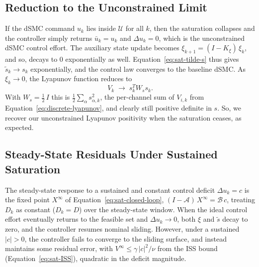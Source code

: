 \documentclass[conf]{new-aiaa}
\begin{document}
\subsection{Reduction to the Unconstrained Limit}
\label{sec:sat-reduction}

If the dSMC command $u_k$ lies inside $\mathcal{U}$ for all $k$, then the saturation collapses and the controller simply returns $\bar u_k = u_k$ and $\Delta u_k = 0$, which is the unconstrained dSMC control effort. The auxiliary state update becomes $\xi_{k+1} = (I - K_\xi)\, \xi_k$, and so, decays to $0$ exponentially as well. Equation~\ref{eq:sat-tilde-s} thus gives $\tilde s_k \to s_k$ exponentially, and the control law converges to the baseline dSMC. As $\xi_k \to 0$, the Lyapunov function reduces to
\begin{equation}
\label{eq:sat-V-reduction}
V_k \;\longrightarrow\; s_k^T W_s s_k.
\end{equation}
With $W_s = \tfrac{1}{2}\, I$ this is $\tfrac{1}{2} \sum_\alpha s_{\alpha,k}^2$, the per-channel sum of $V_{i,k}$ from Equation~\ref{eq:discrete-lyapunov}, and clearly still positive definite in $s$. So, we recover our unconstrained Lyapunov positivity when the saturation ceases, as expected.

\subsection{Steady-State Residuals Under Sustained Saturation}
\label{sec:sat-steadystate}

The steady-state response to a sustained and constant control deficit $\Delta u_k = c$ is the fixed point $X^\infty$ of Equation~\ref{eq:sat-closed-loop}, $(I - \mathcal{A})\, X^\infty = \mathcal{B}\, c$, treating $D_k$ as constant ($D_k = D$) over the steady-state window. When the ideal control effort eventually returns to the feasible set and $\Delta u_k \to 0$, both $\xi$ and $\tilde s$ decay to zero, and the controller resumes nominal sliding. However, under a sustained $|c| > 0$, the controller fails to converge to the sliding surface, and instead maintains some residual error, with $V^\infty \leq \gamma\, |c|^2 / \nu$ from the ISS bound (Equation~\ref{eq:sat-ISS}), quadratic in the deficit magnitude.
\end{document}
